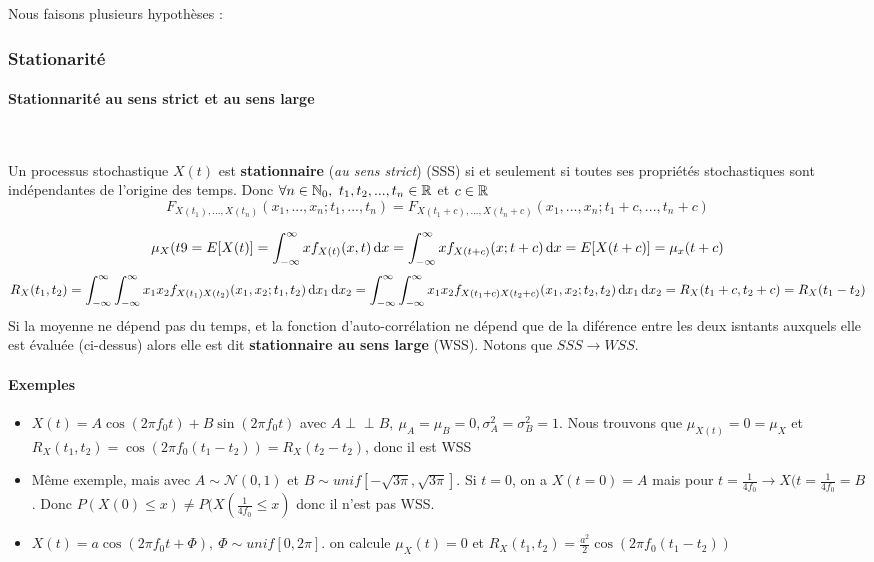 \documentclass[11pt,a4paper]{article}
\newcommand{\indep}{\perp\!\!\!\perp}
\numberwithin{equation}{section}
\begin{document}
Nous faisons plusieurs hypothèses : 

\subsubsection{Stationarité}
\paragraph{Stationnarité au sens strict et au sens large}~

Un processus stochastique $X(t)$ est \textbf{stationnaire} (\textit{au sens strict}) (SSS) si et seulement si toutes ses propriétés stochastiques sont indépendantes de l'origine des temps. Donc $\forall n \in \mathbb{N}_0,\ t_1,t_2,...,t_n \in \mathbb{R}$ et $c \in \mathbb{R}$
\[F_{X(t_1),...,X(t_n)}(x_1,...,x_n;t_1,...,t_n) = F_{X(t_1+c),...,X(t_n+c)}(x_1,...,x_n;t_1+c,...,t_n+c)\]

\[\mu_X(t9 = E[X(t)] = \int_{-\infty}^{\infty} x f_{X(t)} (x,t)\, \mathrm d x = \int_{-\infty}^{\infty} x f_{X(t+c)}(x;t+c) \, \mathrm d x = E[X(t+c)] = \mu_x(t+c)\]
\[R_X(t_1,t_2) = \int_{-\infty}^{\infty}\int_{-\infty}^{\infty} x_1x_2 f_{X(t_1)X(t_2)}(x_1,x_2;t_1,t_2)\, \mathrm d x_1 \, \mathrm d x_2 = \int_{-\infty}^{\infty}\int_{-\infty}^{\infty} x_1x_2f_{X(t_1+c)X(t_2+c)}(x_1,x_2;t_2,t_2) \, \mathrm d x_1 \, \mathrm d x_2 = R_X(t_1+c,t_2+c) = R_X(t_1-t_2)\]
Si la moyenne ne dépend pas du temps, et la fonction d'auto-corrélation ne dépend que de la diférence entre les deux isntants auxquels elle est évaluée (ci-dessus) alors elle est dit \textbf{stationnaire au sens large} (WSS). Notons que $SSS \to WSS$.

\paragraph{Exemples}
\begin{itemize}
    \item $X(t) = A \cos(2\pi f_0 t) + B \sin(2\pi f_0 t)$ avec $A \indep B,\ \mu_A = \mu_B = 0, \sigma_A^2 = \sigma_B^2 = 1$. Nous trouvons que $\mu_{X(t)} = 0 = \mu_X$ et $R_X(t_1,t_2) = \cos(2\pi f_0(t_1-t_2)) = R_X(t_2-t_2)$, donc il est WSS
    \item Même exemple, mais avec $A \sim \mathcal{N}(0,1)$ et $B\sim unif[-\sqrt{3\pi},\sqrt{3\pi}]$. Si $t=0$, on a $X(t=0) = A$ mais pour $t=\frac{1}{4f_0} \to X(t=\frac{1}{4f_0} = B$. Donc $P(X(0) \leq x) \neq P(X(\frac{1}{4f_0} \leq x)$ donc il n'est pas WSS. 
    \item $X(t) = a \cos(2\pi f_0 t + \Phi),\ \Phi \sim unif[0,2\pi]$. on calcule $\mu_X(t) = 0$ et $R_X(t_1,t_2) = \frac{a^2}{2} \cos(2\pi f_0(t_1-t_2))$
\end{itemize}
\end{document}
